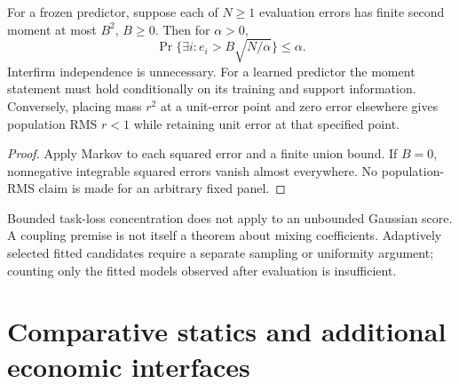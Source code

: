 \begin{theorem}\label{thm:random-panel}
  \leanok
  For a frozen predictor, suppose each of $N\ge1$ evaluation errors has
  finite second moment at most $B^2$, $B\ge0$. Then for $\alpha>0$,
  \[
    \Pr\{\exists i:e_i>B\sqrt{N/\alpha}\}\le\alpha.
  \]
  Interfirm independence is unnecessary. For a learned predictor the moment
  statement must hold conditionally on its training and support information.
  Conversely, placing mass $r^2$ at a unit-error point and zero error elsewhere
  gives population RMS $r<1$ while retaining unit error at that specified point.
\end{theorem}
\begin{proof}\leanok
  Apply Markov to each squared error and a finite union bound. If $B=0$,
  nonnegative integrable squared errors vanish almost everywhere. No
  population-RMS claim is made for an arbitrary fixed panel.
\end{proof}

Bounded task-loss concentration does not apply to an unbounded Gaussian score.
A coupling premise is not itself a theorem about mixing coefficients.
Adaptively selected fitted candidates require a separate sampling or uniformity
argument; counting only the fitted models observed after evaluation
is insufficient.

\section{Comparative statics and additional economic
interfaces}\label{sec:bp-comparative-extensions}

